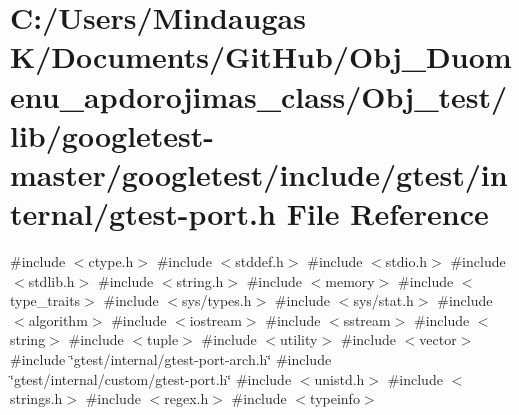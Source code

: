\hypertarget{_obj__test_2lib_2googletest-master_2googletest_2include_2gtest_2internal_2gtest-port_8h}{}\section{C\+:/\+Users/\+Mindaugas K/\+Documents/\+Git\+Hub/\+Obj\+\_\+\+Duomenu\+\_\+apdorojimas\+\_\+class/\+Obj\+\_\+test/lib/googletest-\/master/googletest/include/gtest/internal/gtest-\/port.h File Reference}
\label{_obj__test_2lib_2googletest-master_2googletest_2include_2gtest_2internal_2gtest-port_8h}
{\ttfamily \#include $<$ctype.\+h$>$}\newline
{\ttfamily \#include $<$stddef.\+h$>$}\newline
{\ttfamily \#include $<$stdio.\+h$>$}\newline
{\ttfamily \#include $<$stdlib.\+h$>$}\newline
{\ttfamily \#include $<$string.\+h$>$}\newline
{\ttfamily \#include $<$memory$>$}\newline
{\ttfamily \#include $<$type\+\_\+traits$>$}\newline
{\ttfamily \#include $<$sys/types.\+h$>$}\newline
{\ttfamily \#include $<$sys/stat.\+h$>$}\newline
{\ttfamily \#include $<$algorithm$>$}\newline
{\ttfamily \#include $<$iostream$>$}\newline
{\ttfamily \#include $<$sstream$>$}\newline
{\ttfamily \#include $<$string$>$}\newline
{\ttfamily \#include $<$tuple$>$}\newline
{\ttfamily \#include $<$utility$>$}\newline
{\ttfamily \#include $<$vector$>$}\newline
{\ttfamily \#include \char`\"{}gtest/internal/gtest-\/port-\/arch.\+h\char`\"{}}\newline
{\ttfamily \#include \char`\"{}gtest/internal/custom/gtest-\/port.\+h\char`\"{}}\newline
{\ttfamily \#include $<$unistd.\+h$>$}\newline
{\ttfamily \#include $<$strings.\+h$>$}\newline
{\ttfamily \#include $<$regex.\+h$>$}\newline
{\ttfamily \#include $<$typeinfo$>$}\newline
